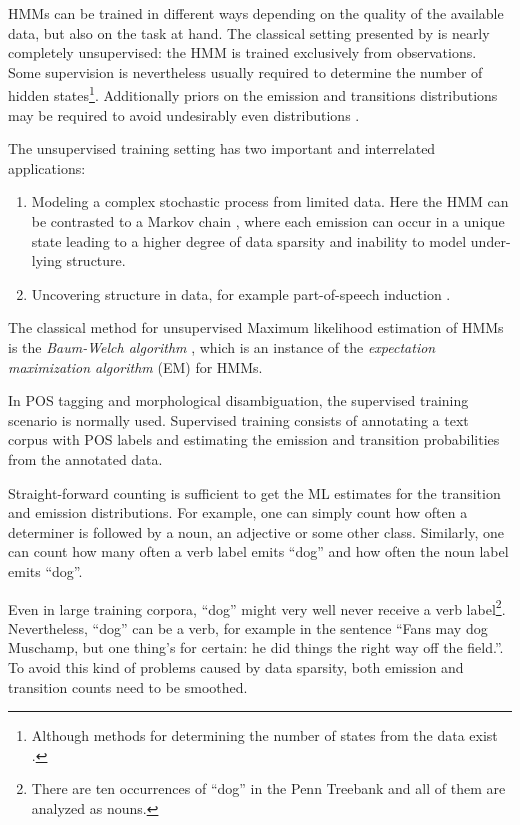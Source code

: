 HMMs can be trained in different ways depending on the quality of the
available data, but also on the task at hand. The classical setting
presented by \cite{Rabiner1989} is nearly completely unsupervised: the
HMM is trained exclusively from observations. Some supervision is
nevertheless usually required to determine the number of hidden
states\footnote{Although methods for determining the number of states
  from the data exist \citep{foo}.}. Additionally priors on the
emission and transitions distributions may be required to avoid
undesirably even distributions
\citep{Cutting1992,Johnson2007}.

The unsupervised training setting has two important and
interrelated applications:
\begin{enumerate}
\item Modeling a complex stochastic process from limited data. Here
  the HMM can be contrasted to a Markov chain \citep[318--320]{Manning1999}, where
  each emission can occur in a unique state leading to a higher degree
  of data sparsity and inability to model under-lying structure.
\item Uncovering structure in data, for example part-of-speech
  induction \citep{Johnson2007}.
\end{enumerate}
The classical method for unsupervised Maximum likelihood estimation of
HMMs is the {\it Baum-Welch algorithm} \citep{Rabiner1989}, which is
an instance of the {\it expectation maximization algorithm} (EM)
\citep{Dempster1977} for HMMs.

In POS tagging and morphological disambiguation, the supervised
training scenario is normally used. Supervised training consists of
annotating a text corpus with POS labels and estimating the emission
and transition probabilities from the annotated data. 

Straight-forward counting is sufficient to get the ML estimates for
the transition and emission distributions. For example, one can simply
count how often a determiner is followed by a noun, an adjective or
some other class. Similarly, one can count how many often a verb label
emits ``dog'' and how often the noun label emits ``dog''. 

Even in large training corpora, ``dog'' might very well never receive
a verb label\footnote{There are ten occurrences of ``dog'' in the Penn
  Treebank and all of them are analyzed as nouns.}. Nevertheless,
``dog'' can be a verb, for example in the sentence ``Fans may dog
Muschamp, but one thing's for certain: he did things the right way off
the field.''. To avoid this kind of problems caused by data sparsity,
both emission and transition counts need to be smoothed.

